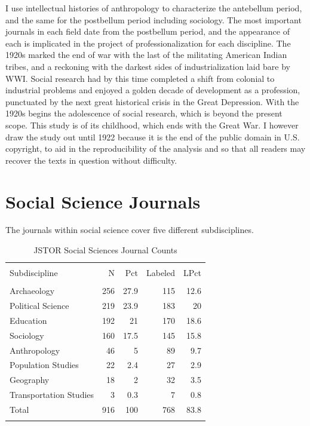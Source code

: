 \documentclass[]{book}
\theoremstyle{definition}
\theoremstyle{definition}
\theoremstyle{definition}
\theoremstyle{remark}
\begin{document}
I use intellectual histories of anthropology to characterize the
antebellum period, and the same for the postbellum period including
sociology. The most important journals in each field date from the
postbellum period, and the appearance of each is implicated in the
project of professionalization for each discipline. The 1920s marked the
end of war with the last of the militating American Indian tribes, and a
reckoning with the darkest sides of industrialization laid bare by WWI.
Social research had by this time completed a shift from colonial to
industrial problems and enjoyed a golden decade of development as a
profession, punctuated by the next great historical crisis in the Great
Depression. With the 1920s begins the adolescence of social research,
which is beyond the present scope. This study is of its childhood, which
ends with the Great War. I however draw the study out until 1922 because
it is the end of the public domain in U.S. copyright, to aid in the
reproducibility of the analysis and so that all readers may recover the
texts in question without difficulty.

\hypertarget{kd-dq2}{%
\section{Social Science Journals}\label{kd-dq2}}

The journals within social science cover five different subdisciplines.

\begin{table}[!htbp] \centering 
  \caption{JSTOR Social Sciences Journal Counts} 
  \label{tab:jclu-tab-sub} 
\begin{tabular}{@{\extracolsep{5pt}} lrrrr} 
\\[-1.8ex]\hline 
\hline \\[-1.8ex] 
Subdiscipline & N & Pct & Labeled & LPct \\ 
\hline \\[-1.8ex] 
Archaeology & 256 & 27.9 & 115 & 12.6 \\ 
Political Science & 219 & 23.9 & 183 & 20 \\ 
Education & 192 & 21 & 170 & 18.6 \\ 
Sociology & 160 & 17.5 & 145 & 15.8 \\ 
Anthropology & 46 & 5 & 89 & 9.7 \\ 
Population Studies & 22 & 2.4 & 27 & 2.9 \\ 
Geography & 18 & 2 & 32 & 3.5 \\ 
Transportation Studies & 3 & 0.3 & 7 & 0.8 \\ 
Total & 916 & 100 & 768 & 83.8 \\ 
\hline \\[-1.8ex] 
\end{tabular} 
\end{table}
\end{document}
